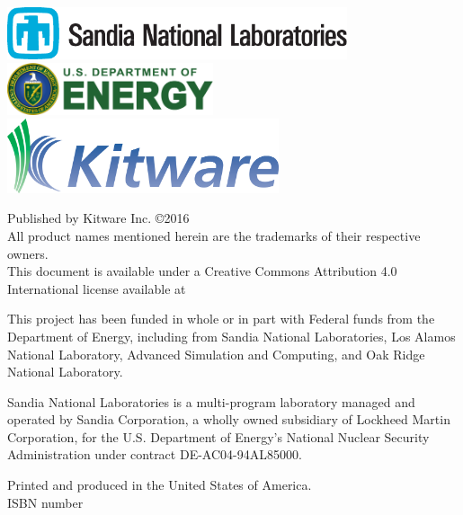 \vspace*{\fill}
\begin{centering}
\includegraphics[height=0.6in]{images/SandiaLogo}\hfill
\includegraphics[height=0.6in]{images/DOELogo}\\
\includegraphics[width=8cm]{images/KitwareLogo}

Published by Kitware Inc. \copyright  2016\\

All product names mentioned herein are the trademarks of their respective owners. \\

This document is available under a Creative Commons Attribution 4.0
International license available at %

This project has been funded in whole or in part with Federal funds from
the Department of Energy, including from Sandia National Laboratories, Los
Alamos National Laboratory, Advanced Simulation and Computing, and Oak
Ridge National Laboratory.

Sandia National Laboratories is a multi-program laboratory managed and
operated by Sandia Corporation, a wholly owned subsidiary of Lockheed
Martin Corporation, for the U.S. Department of Energy's National Nuclear
Security Administration under contract DE-AC04-94AL85000.

Printed and produced in the United States of America.\\
ISBN number \\
\end{centering}
\vspace*{\fill}

\newpage
\vspace*{\fill}
\hrulefill \\


